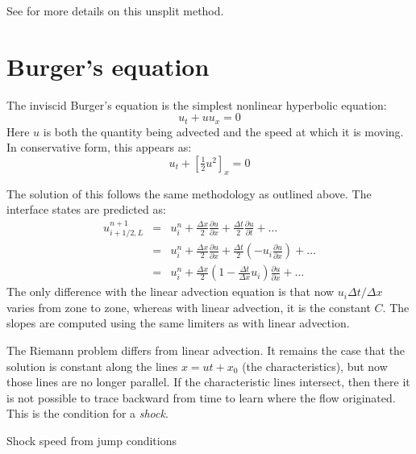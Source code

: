 See \cite{colella:1990} for more details on this unsplit method.


\section{Burger's equation}

The inviscid Burger's equation is the simplest nonlinear hyperbolic
equation:
\begin{equation}
u_t + u u_x = 0
\end{equation}
Here $u$ is both the quantity being advected and the speed at which 
it is moving.
In conservative form, this appears as:
\begin{equation}
u_t + \left [\tfrac{1}{2} u^2 \right ]_x = 0
\end{equation}

The solution of this follows the same methodology as outlined above.
The interface states are predicted as:
\begin{eqnarray}
u^{n+1}_{i+1/2,L} &=& u^n_i + \frac{\Delta x}{2} \frac{\partial u}{\partial x}
                        + \frac{\Delta t}{2} \frac{\partial u}{\partial t} + \ldots \\
                &=& u^n_i + \frac{\Delta x}{2} \frac{\partial u}{\partial x}
                        + \frac{\Delta t}{2} \left (-u_i \frac{\partial u}{\partial x} \right ) + \ldots \\
                &=& u^n_i + \frac{\Delta x}{2} \left ( 1 - \frac{\Delta t}{\Delta x}u_i \right ) \frac{\partial u}{\partial x} + \ldots
\end{eqnarray}
The only difference with the linear advection equation is that now
$u_i \Delta t/\Delta x$ varies from zone to zone, whereas with linear
advection, it is the constant $C$.  The slopes are computed using
the same limiters as with linear advection.

The Riemann problem differs from linear advection.  It remains the
case that the solution is constant along the lines $x = ut + x_0$ (the
characteristics), but now those lines are no longer parallel.  If the
characteristic lines intersect, then there it is not possible to trace
backward from time to learn where the flow originated.  This is the 
condition for a {\em shock}.

Shock speed from jump conditions

